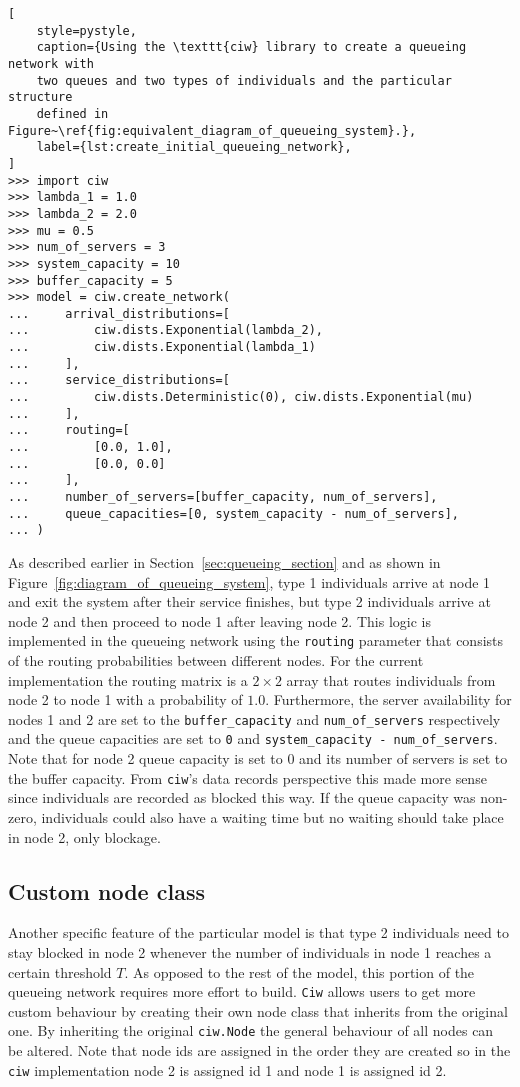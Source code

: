 \begin{lstlisting}[
    style=pystyle,
    caption={Using the \texttt{ciw} library to create a queueing network with
    two queues and two types of individuals and the particular structure
    defined in Figure~\ref{fig:equivalent_diagram_of_queueing_system}.},
    label={lst:create_initial_queueing_network},
]
>>> import ciw
>>> lambda_1 = 1.0
>>> lambda_2 = 2.0
>>> mu = 0.5
>>> num_of_servers = 3
>>> system_capacity = 10
>>> buffer_capacity = 5
>>> model = ciw.create_network(
...     arrival_distributions=[
...         ciw.dists.Exponential(lambda_2),
...         ciw.dists.Exponential(lambda_1)
...     ],
...     service_distributions=[
...         ciw.dists.Deterministic(0), ciw.dists.Exponential(mu)
...     ],
...     routing=[
...         [0.0, 1.0],
...         [0.0, 0.0]
...     ],
...     number_of_servers=[buffer_capacity, num_of_servers],
...     queue_capacities=[0, system_capacity - num_of_servers],
... )

\end{lstlisting}

As described earlier in Section~\ref{sec:queueing_section} and as shown in
Figure~\ref{fig:diagram_of_queueing_system}, type 1 individuals arrive at
node 1 and exit the system after their service finishes, but type 2 individuals
arrive at node 2 and then proceed to node 1 after leaving node 2.
This logic is implemented in the queueing network using the
\texttt{routing} parameter that consists of the routing
probabilities between different nodes.
For the current implementation the routing matrix is a \(2 \times 2\) array
that routes individuals from node 2 to node 1 with a probability of
\(1.0\).
Furthermore, the server availability for nodes 1 and 2 are set to
the \texttt{buffer\_capacity} and
\texttt{num\_of\_servers} respectively and the queue capacities
are set to \texttt{0} and
\texttt{system\_capacity - num\_of\_servers}.
Note that for node 2 queue capacity is set to 0 and its
number of servers is set to the buffer capacity.
From \texttt{ciw}'s data records perspective this made more
sense since individuals are recorded as blocked this way.
If the queue capacity was non-zero, individuals could also have a waiting time
but no waiting should take place in node 2, only blockage.


\subsection{Custom node class}
Another specific feature of the particular model is that type 2 individuals
need to stay blocked in node 2 whenever the number of individuals in node 1
reaches a certain threshold \(T\).
As opposed to the rest of the model, this portion of the queueing network
requires more effort to build.
\texttt{Ciw} allows users to get more custom behaviour by
creating their own node class that inherits from the original one.
By inheriting the original \texttt{ciw.Node} the general
behaviour of all nodes can be altered.
Note that node ids are assigned in the order they are created so in the
\texttt{ciw} implementation node 2 is assigned id 1 and node 1
is assigned id 2.


